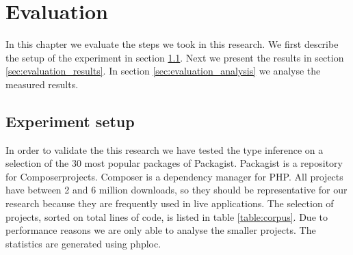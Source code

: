 \documentclass[../main.tex]{subfiles}
\begin{document}
    \chapter{Evaluation}\label{ch:evaluation}
    
	In this chapter we evaluate the steps we took in this research.
	We first describe the setup of the experiment in section \ref{sec:evaluation_experiment_setup}.
	Next we present the results in section \ref{sec:evaluation_results}.
	In section \ref{sec:evaluation_analysis} we analyse the measured results.
	
	\section{Experiment setup}\label{sec:evaluation_experiment_setup}
	
	In order to validate the this research we have tested the type inference on a selection of the 30 most popular packages of Packagist\footnotemark.
	Packagist is a repository for Composer\footnotemark projects.
	Composer is a dependency manager for PHP.
	All projects have between 2 and 6 million downloads, so they should be representative for our research because they are frequently used in live applications.
	The selection of projects, sorted on total lines of code, is listed in table \ref{table:corpus}.
	Due to performance reasons we are only able to analyse the smaller projects.
	The statistics are generated using phploc\footnotemark.
\end{document}
